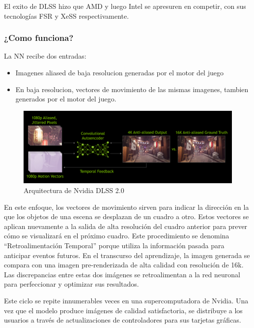 \documentclass[runningheads]{llncs} %
\begin{document}
El exito de DLSS hizo que AMD y luego Intel se apresuren en competir, con sus tecnologías
FSR y XeSS respectivamente.

\subsubsection{¿Como funciona?}
La NN recibe dos entradas: 
\begin{itemize}
    \item{Imagenes aliased de baja resolucion generadas por el motor del
    juego}
    \item{En baja resolucion, vectores de movimiento de las mismas imagenes,
    tambien generados por el motor del juego.}
\end{itemize}

\begin{figure}
    \centering
    \includegraphics[scale=0.4]{dlss.jpg}
    \caption{Arquitectura de Nvidia DLSS 2.0 \cite{ej-dlss2}}
    \label{fig:arquitectura-dlss}
\end{figure}

En este enfoque, los vectores de movimiento sirven para indicar la dirección 
en la que los objetos de una escena se desplazan de un cuadro a otro. 
Estos vectores se aplican nuevamente a la salida de alta resolución 
del cuadro anterior para prever cómo se visualizará en el próximo cuadro. 
Este procedimiento se denomina 
\textquotedblleft{}Retroalimentación Temporal\textquotedblright{}
porque utiliza la información pasada para anticipar eventos futuros. 
En el transcurso del aprendizaje, la imagen generada se compara con una 
imagen pre-renderizada de alta calidad con resolución de 16k.
Las discrepancias entre estas dos imágenes se retroalimentan a la red neuronal 
para perfeccionar y optimizar sus resultados. \cite{ej-dlss2}

Este ciclo se repite innumerables veces en una supercomputadora de Nvidia. 
Una vez que el modelo produce imágenes de calidad satisfactoria, 
se distribuye a los usuarios a través de actualizaciones de controladores 
para sus tarjetas gráficas. \cite{ej-dlss2}
\end{document}
